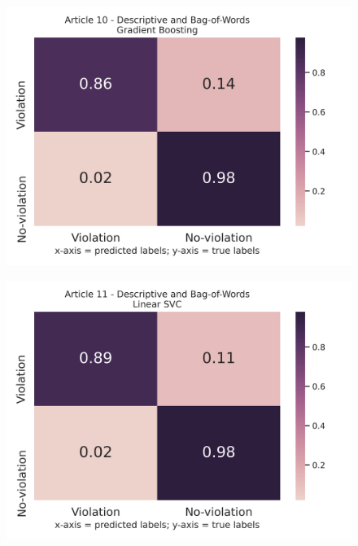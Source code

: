 \documentclass{article}
\begin{document}
\begin{figure}[!htb]
	\centering
    \includegraphics[scale=0.5]{data/analysis/cm/binary_cm_normalized_test_article_10.png}  
\end{figure}
\begin{figure}[!htb]
	\centering
    \includegraphics[scale=0.5]{data/analysis/cm/binary_cm_normalized_test_article_11.png}  
\end{figure}
\end{document}
